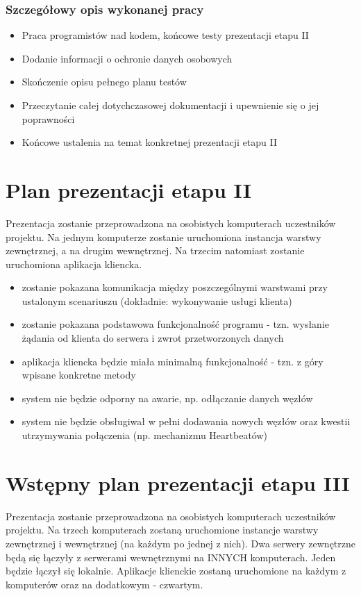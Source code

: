 \subsubsection*[Szczegółowy opis wykonanej pracy]{Szczegółowy opis wykonanej pracy}
\begin{itemize}
\item Praca programistów nad kodem, końcowe testy prezentacji etapu II
\item Dodanie informacji o ochronie danych osobowych
\item Skończenie opisu pełnego planu testów
\item Przeczytanie całej dotychczasowej dokumentacji i upewnienie się o jej poprawności
\item Końcowe ustalenia na temat konkretnej prezentacji etapu II
\end{itemize}

\pagebreak

\section[Plan prezentacji etapu II]{Plan prezentacji etapu II}
\par{Prezentacja zostanie przeprowadzona na osobistych komputerach uczestników projektu. Na jednym komputerze zostanie uruchomiona instancja warstwy zewnętrznej, a na drugim wewnętrznej. Na trzecim natomiast zostanie uruchomiona aplikacja kliencka.}

\begin{itemize}
\item zostanie pokazana komunikacja między poszczególnymi warstwami przy ustalonym scenariuszu (dokładnie: wykonywanie usługi klienta)
\item zostanie pokazana podstawowa funkcjonalność programu - tzn. wysłanie żądania od klienta do serwera i zwrot przetworzonych danych
\item aplikacja kliencka będzie miała minimalną funkcjonalność - tzn. z góry wpisane konkretne metody
\item system nie będzie odporny na awarie, np. odłączanie danych węzłów
\item system nie będzie obsługiwał w pełni dodawania nowych węzłów oraz kwestii utrzymywania połączenia (np. mechanizmu Heartbeatów)
\end{itemize}

\section[Wstępny plan prezentacji etapu III]{Wstępny plan prezentacji etapu III}
\par{Prezentacja zostanie przeprowadzona na osobistych komputerach uczestników projektu. Na trzech komputerach zostaną uruchomione instancje warstwy zewnętrznej i wewnętrznej (na każdym po jednej z nich). Dwa serwery zewnętrzne będą się łączyły z serwerami wewnętrznymi na INNYCH komputerach. Jeden będzie łączył się lokalnie. Aplikacje klienckie zostaną uruchomione na każdym z komputerów oraz na dodatkowym - czwartym.}

